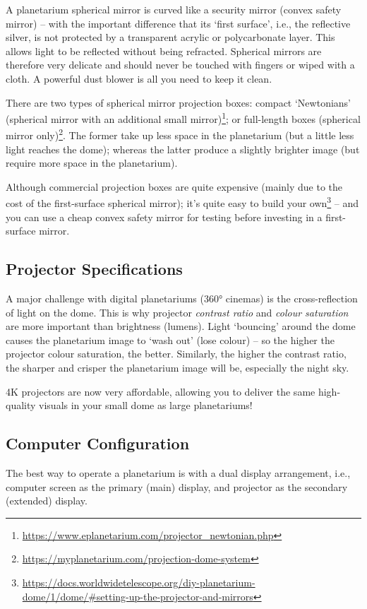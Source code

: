 A planetarium spherical mirror is curved like a security mirror (convex safety mirror) -- with the important
difference that its `first surface', i.e., the reflective silver, is not protected by a transparent acrylic or
polycarbonate layer. This allows light to be reflected without being refracted. Spherical mirrors are therefore
very delicate and should never be touched with fingers or wiped with a cloth. A powerful dust blower is all
you need to keep it clean.

There are two types of spherical mirror projection boxes: compact `Newtonians' (spherical mirror with an
additional small mirror)\footnote{\url{https://www.eplanetarium.com/projector_newtonian.php}}; 
or full-length boxes (spherical mirror only)\footnote{\url{https://myplanetarium.com/projection-dome-system}}. 
The former take up less space in the planetarium (but a little less light reaches the dome); 
whereas the latter produce a slightly brighter image (but require more space in the planetarium).

Although commercial projection boxes are quite expensive (mainly due to the cost of the first-surface spherical mirror); 
it's quite easy to build your 
own\footnote{\url{https://docs.worldwidetelescope.org/diy-planetarium-dome/1/dome/#setting-up-the-projector-and-mirrors}} 
-- and you can use a cheap convex safety mirror for testing before investing in a first-surface mirror.

\subsection{Projector Specifications}
A major challenge with digital planetariums (360° cinemas) is the cross-reflection of light on the dome. 
This is why projector \emph{contrast ratio} and \emph{colour saturation} are more important than brightness (lumens). 
Light `bouncing' around the dome causes the planetarium image to `wash out' (lose colour) -- 
so the higher the projector colour saturation, the better. 
Similarly, the higher the contrast ratio, the sharper and crisper the planetarium image will be, especially the night sky.

4K projectors are now very affordable, allowing you to deliver the same high-quality visuals in your small
dome as large planetariums!

\subsection{Computer Configuration}
The best way to operate a planetarium is with a dual display arrangement, i.e., 
computer screen as the primary (main) display, and projector as the secondary (extended) display.

